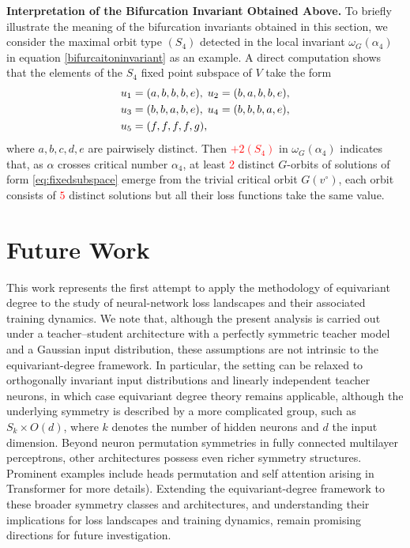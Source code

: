 \documentclass{amsart}%
\begin{document}
\textbf{Interpretation of the Bifurcation Invariant Obtained Above.} To briefly illustrate the meaning of the bifurcation invariants obtained in this section, we consider the maximal orbit type \((S_4)\) detected in the local invariant $\omega_G(\alpha_4)$ in equation \eqref{bifurcaitoninvariant} as an example. A direct computation shows that the elements of the $S_4$ fixed point subspace of $V$ take the form
\begin{align}\label{eq:fixedsubspace}
u_1&=(a,b,b,b,e),\; u_2=(b,a,b,b,e),\\
u_3&=(b,b,a,b,e),\; u_4=(b,b,b,a,e),\notag\\
u_5&=(f,f,f,f,g),\notag
\end{align}
where $a,b,c,d,e$ are pairwisely distinct.
Then \textcolor{red}{\(+2(S_4)\)} in \(\omega_G(\alpha_4)\) indicates that, as \(\alpha\) crosses critical number \(\alpha_4\), at least \textcolor{red}{2} distinct \(G\)-orbits of solutions of form \eqref{eq:fixedsubspace} emerge from the trivial critical orbit \(G(v^\circ)\), each orbit consists of \textcolor{red}{$5$} distinct solutions but all their loss functions take the same value.
\section{Future Work}
This work represents the first attempt to apply the methodology of equivariant degree to the study of neural-network loss landscapes and their associated training dynamics. We note that, although the present analysis is carried out under a teacher–student architecture with a perfectly symmetric teacher model and a Gaussian input distribution, these assumptions are not intrinsic to the equivariant-degree framework. In particular, the setting can be relaxed to orthogonally invariant input distributions and linearly independent teacher neurons, in which case equivariant degree theory remains applicable, although the underlying symmetry is described by a more complicated group, such as \(S_k\times O(d)\), where \(k\) denotes the number of hidden neurons and \(d\) the input dimension. Beyond neuron permutation symmetries in fully connected multilayer perceptrons, other architectures possess even richer symmetry structures. Prominent examples include heads permutation and self attention arising in Transformer for more details). Extending the equivariant-degree framework to these broader symmetry classes and architectures, and understanding their implications for loss landscapes and training dynamics, remain promising directions for future investigation.
\appendix
\end{document}
